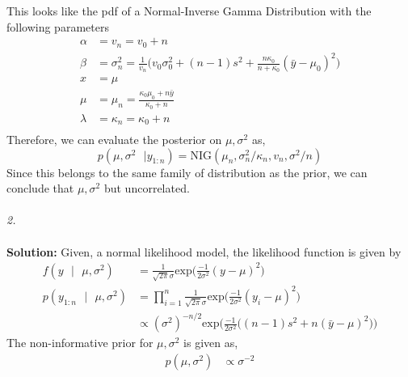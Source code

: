 \documentclass[11pt]{article}
\begin{document}
This looks like the pdf of a Normal-Inverse Gamma Distribution with the following parameters
\begin{equation}
  \nonumber
  \begin{aligned}
    \alpha & = v_{n} = v_{0} + n\\
    \beta & = \sigma_{n}^{2} = \frac{1}{v_{n}}\bigg(v_{0} \sigma_{0}^{2} + (n-1)s^2 + \frac{n\kappa_{0}}{n + \kappa_{0}}(\bar{y} - \mu_{0})^{2}\bigg)\\
    x & = \mu\\
    \mu & = \mu_{n} = \frac{\kappa_{0}\mu_{0} + n\bar{y}}{\kappa_{0} + n}\\
    \lambda & = \kappa_{n} = \kappa_{0} + n\\
  \end{aligned}
\end{equation}
Therefore, we can evaluate the posterior on $\mu, \sigma^{2}$ as,
\begin{equation}
  \nonumber
  p(\mu, \sigma^2 \text{ } | { } y_{1:n}) = \text{NIG}(\mu_{n}, \sigma_{n}^{2}/\kappa_{n}, v_{n}, \sigma^{2}/n)
\end{equation}
Since this belongs to the same family of distribution as the prior, we can conclude that $\mu, \sigma^2$ but uncorrelated. \\ \\
\emph{2.}\\ \\
\textbf{Solution: }
Given, a normal likelihood model, the likelihood function is given by
\begin{equation}
  \nonumber
  \begin{aligned}
    f(y \text{ } | \text{ } \mu, \sigma^2) & = \frac{1}{\sqrt{2 \pi} \sigma}\text{exp}\bigg(\frac{-1}{2 \sigma^2}(y - \mu)^2 \bigg)\\
    p(y_{1:n} \text{ } | \text{ } \mu, \sigma^2) & = \prod_{i = 1}^{n}\frac{1}{\sqrt{2 \pi} \sigma}\text{exp}\bigg(\frac{-1}{2 \sigma^2}(y_{i} - \mu)^2 \bigg)\\
    & \propto (\sigma^2)^{-n/2}\text{exp}\bigg(\frac{-1}{2 \sigma^2}\big((n-1)s^2 + n(\bar{y} - \mu)^2\big)\bigg)
  \end{aligned}
\end{equation}
The non-informative prior for $\mu, \sigma^2$ is given as,
\begin{equation}
  \nonumber
  \begin{aligned}
    p(\mu, \sigma^2) & \propto \sigma^{-2}\\
  \end{aligned}
\end{equation}
\end{document}
